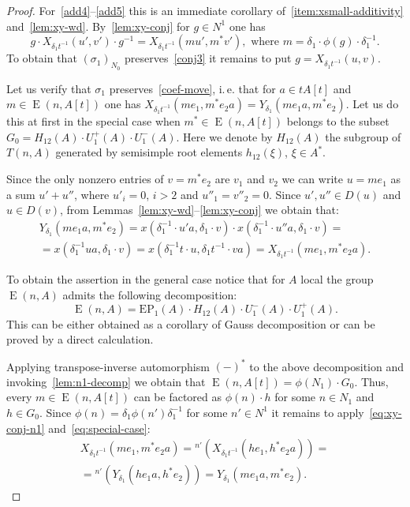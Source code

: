 \documentclass[oneside, 10pt]{amsart}
\DeclareMathOperator{\E}{E}
\numberwithin{equation}{section}
\numberwithin{lemma}{section}
\theoremstyle{definition}
\theoremstyle{remark}
\begin{document}
\begin{proof}
 For~\eqref{add4}--\eqref{add5} this is an immediate corollary of~\cref{item:xsmall-additivity} and~\cref{lem:xy-wd}.
 By~\cref{lem:xy-conj} for $g \in N^1$ one has 
 \begin{equation} \label{eq:xy-conj-n1}
  g \cdot X_{\delta_1 t^{-1}}(u', v') \cdot g^{-1} = X_{\delta_1 t^{-1}}(mu', m^*v'), \text{ where } m = \delta_1 \cdot \phi(g) \cdot \delta_1^{-1}.
 \end{equation}
 To obtain that $(\sigma_1)_{N_0}$ preserves~\eqref{conj3} it remains to put $g = X_{\delta_1 t^{-1}}(u, v)$.
 
 Let us verify that $\sigma_1$ preserves~\eqref{coef-move}, i.\,e. that for $a\in tA[t]$ and $m \in \E(n, A[t])$ one has
 $X_{\delta_1 t^{-1}}(me_1, m^*e_2 a) = Y_{\delta_1}(me_1 a, m^* e_2)$.
 Let us do this at first in the special case when $m^* \in \E(n, A[t])$ belongs to the subset $G_0 = H_{12}(A) \cdot U^+_1(A) \cdot U^-_1(A)$.
 Here we denote by $H_{12}(A)$ the subgroup of $T(n, A)$ generated by semisimple root elements $ h_{12}(\xi)$, $\xi \in A^*$.

 Since the only nonzero entries of $v = m^* e_2$ are $v_1$ and $v_2$ we can write $u = m e_1$ as a sum $u' + u''$, where 
  $u'_i=0$, $i>2$ and $u''_1=v''_2=0$.
 Since $u', u'' \in D(u)$ and $u \in D(v)$, from Lemmas~\ref{lem:xy-wd}--\ref{lem:xy-conj} we obtain that:
 \begin{multline} \label{eq:special-case}
  Y_{\delta_1}(me_1 a, m^* e_2) = x(\delta_1^{-1} \cdot u'a, \delta_1\cdot  v) \cdot x(\delta_1^{-1}\cdot u''a, \delta_1 \cdot v) = \\
   = x(\delta_1^{-1} ua, \delta_1 \cdot v) = x(\delta_1^{-1}t \cdot u, \delta_1t^{-1} \cdot v a) = X_{\delta_1 t^{-1}}(me_1, m^*e_2 a).
\end{multline}

 To obtain the assertion in the general case notice that for $A$ local the group $\E(n, A)$ admits the following decomposition:
 \[\E(n, A) = \mathrm{EP}_1(A) \cdot H_{12}(A) \cdot U^-_1(A) \cdot U^+_1(A).\]
 This can be either obtained as a corollary of Gauss decomposition or can be proved by a direct calculation. %

 Applying transpose-inverse automorphism $(-)^*$ to the above decomposition and invoking~\cref{lem:n1-decomp} we obtain that $\E(n, A[t]) = \phi(N_1) \cdot G_0$.
 Thus, every $m \in \E(n, A[t])$ can be factored as $\phi(n) \cdot h$ for some $n\in N_1$ and $h \in G_0$.
 Since $\phi(n) = \delta_1 \phi(n') \delta_1^{-1}$ for some $n' \in N^1$ it remains to apply~\eqref{eq:xy-conj-n1} and~\eqref{eq:special-case}: 
 \begin{multline} \nonumber X_{\delta_1 t^{-1}}(me_1, m^*e_2 a) = {}^{n'}(X_{\delta_1 t^{-1}}(he_1, h^*e_2 a)) = \\
                            = {}^{n'}(Y_{\delta_1}(he_1 a, h^*e_2)) = Y_{\delta_1}(me_1 a, m^* e_2). \end{multline} 
\end{proof}
\end{document}
